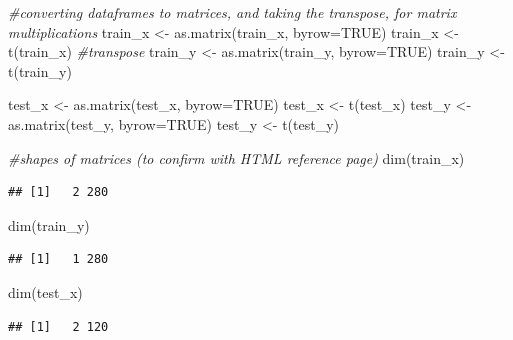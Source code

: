 \documentclass[
]{article}
\newenvironment{Shaded}{\begin{snugshade}}{\end{snugshade}}
\newcommand{\AttributeTok}[1]{\textcolor[rgb]{0.77,0.63,0.00}{#1}}
\newcommand{\CommentTok}[1]{\textcolor[rgb]{0.56,0.35,0.01}{\textit{#1}}}
\newcommand{\ConstantTok}[1]{\textcolor[rgb]{0.00,0.00,0.00}{#1}}
\newcommand{\FunctionTok}[1]{\textcolor[rgb]{0.00,0.00,0.00}{#1}}
\newcommand{\NormalTok}[1]{#1}
\newcommand{\OtherTok}[1]{\textcolor[rgb]{0.56,0.35,0.01}{#1}}
\begin{document}
\begin{Shaded}
\begin{Highlighting}[]
\CommentTok{\#converting dataframes to matrices, and taking the transpose, for matrix multiplications}
\NormalTok{train\_x }\OtherTok{\textless{}{-}} \FunctionTok{as.matrix}\NormalTok{(train\_x, }\AttributeTok{byrow=}\ConstantTok{TRUE}\NormalTok{)}
\NormalTok{train\_x }\OtherTok{\textless{}{-}} \FunctionTok{t}\NormalTok{(train\_x)                     }\CommentTok{\#transpose}
\NormalTok{train\_y }\OtherTok{\textless{}{-}} \FunctionTok{as.matrix}\NormalTok{(train\_y, }\AttributeTok{byrow=}\ConstantTok{TRUE}\NormalTok{)}
\NormalTok{train\_y }\OtherTok{\textless{}{-}} \FunctionTok{t}\NormalTok{(train\_y)}

\NormalTok{test\_x }\OtherTok{\textless{}{-}} \FunctionTok{as.matrix}\NormalTok{(test\_x, }\AttributeTok{byrow=}\ConstantTok{TRUE}\NormalTok{)}
\NormalTok{test\_x }\OtherTok{\textless{}{-}} \FunctionTok{t}\NormalTok{(test\_x)}
\NormalTok{test\_y }\OtherTok{\textless{}{-}} \FunctionTok{as.matrix}\NormalTok{(test\_y, }\AttributeTok{byrow=}\ConstantTok{TRUE}\NormalTok{)}
\NormalTok{test\_y }\OtherTok{\textless{}{-}} \FunctionTok{t}\NormalTok{(test\_y)}


\CommentTok{\#shapes of matrices (to confirm with HTML reference page)}
\FunctionTok{dim}\NormalTok{(train\_x)}
\end{Highlighting}
\end{Shaded}

\begin{verbatim}
## [1]   2 280
\end{verbatim}

\begin{Shaded}
\begin{Highlighting}[]
\FunctionTok{dim}\NormalTok{(train\_y)}
\end{Highlighting}
\end{Shaded}

\begin{verbatim}
## [1]   1 280
\end{verbatim}

\begin{Shaded}
\begin{Highlighting}[]
\FunctionTok{dim}\NormalTok{(test\_x)}
\end{Highlighting}
\end{Shaded}

\begin{verbatim}
## [1]   2 120
\end{verbatim}
\end{document}
